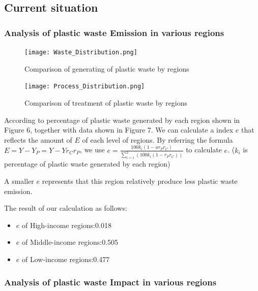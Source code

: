 \documentclass{mcmthesis}
\begin{document}
	 
  \subsection{Current situation}
   \subsubsection{Analysis of plastic waste Emission in various regions}
	\begin{figure}[H]
	 \centering
	  \texttt{[image: Waste\_Distribution.png]}
	 \caption{Comparison of generating of plastic waste by regions}
	\end{figure} 
	\begin{figure}[H]
		\centering
		 \texttt{[image: Process\_Distribution.png]}
		\caption{Comparison of treatment of plastic waste by regions}
	   \end{figure}
	   According to percentage of plastic waste generated by each region shown in Figure 6, together with data shown in Figure 7. We can calculate a index $e$ that reflects the amount of $E$ of each level of regions. By referring the formula $E=Y-Y_P=Y-Yr_Cr_P$, we use 
	   $e=\frac{100k_i(1-ar_Pr_C)}{\sum_{i=1}^3(100k_i(1-r_Pr_C))}$ to calculate $e$. ($k_i$ is percentage of plastic waste generated by each region) 
	   
	   A smaller $e$ represents that this region relatively produce less plastic waste emission.

	  The result of our calculation as follows: 
	  \begin{itemize}
       \item \quad $e$ of High-income regions:0.018
       \item \quad $e$ of Middle-income regions:0.505
       \item \quad $e$ of Low-income regions:0.477
      
	  \end{itemize}
   \subsubsection{Analysis of plastic waste Impact in various regions}
   
\end{document}
